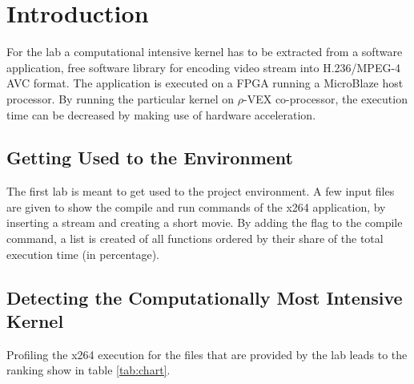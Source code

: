 
\section{Introduction}

For the lab a computational intensive kernel has to be extracted from a  software application, free software library for encoding video stream into H.236/MPEG-4 AVC format. The application is executed on a FPGA running a MicroBlaze host processor. By running the particular kernel on $\rho$-VEX co-processor, the execution time can be decreased by making use of hardware acceleration. 

\subsection{Getting Used to the Environment}
The first lab is meant to get used to the project environment. A few input files are given to show the compile and run commands of the x264 application, by inserting a  stream and creating a short  movie. By adding the  flag to the compile command, a list is created of all functions ordered by their share of the total execution time (in percentage). 

\subsection{Detecting the Computationally Most Intensive Kernel}

Profiling the x264 execution for the  files that are provided by the lab leads to the ranking show in table \ref{tab:chart}.

